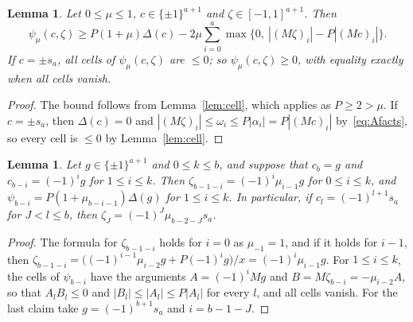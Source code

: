 \documentclass[11pt]{article}
\newtheorem{lemma}[theorem]{Lemma}
\theoremstyle{remark}
\begin{document}
\begin{lemma}\label{lem:onecol}
Let $0\le\mu\le1$, $c\in\{\pm1\}^{a+1}$ and $\zeta\in[-1,1]^{a+1}$. Then
\[
\psi_\mu(c,\zeta)\ge P(1+\mu)\Delta(c)-2\mu\sum_{i=0}^a
\max\bigl\{0,\ |(M\zeta)_i|-P|(Mc)_i|\bigr\}.
\]
If $c=\pm s_a$, all cells of $\psi_\mu(c,\zeta)$ are $\le0$; so
$\psi_\mu(c,\zeta)\ge0$, with equality exactly when all cells vanish.
\end{lemma}
\begin{proof}
The bound follows from Lemma~\ref{lem:cell}, which applies as $P\ge2>\mu$. If
$c=\pm s_a$, then $\Delta(c)=0$ and
$|(M\zeta)_i|\le\omega_i\le P|\alpha_i|=P|(Mc)_i|$ by~\eqref{eq:Afacts}, so
every cell is $\le0$ by Lemma~\ref{lem:cell}.
\end{proof}

\begin{lemma}\label{lem:chain}
Let $g\in\{\pm1\}^{a+1}$ and $0\le k\le b$, and suppose that $c_b=g$ and
$c_{b-i}=(-1)^ig$ for $1\le i\le k$. Then $\zeta_{b-1-i}=(-1)^i\mu_{i-1}g$
for $0\le i\le k$, and $\psi_{b-i}=P(1+\mu_{b-i-1})\Delta(g)$ for
$1\le i\le k$. In particular, if $c_l=(-1)^{l+1}s_a$ for $J<l\le b$, then
$\zeta_J=(-1)^J\mu_{b-2-J}s_a$.
\end{lemma}
\begin{proof}
The formula for $\zeta_{b-1-i}$ holds for $i=0$ as $\mu_{-1}=1$, and if it
holds for $i-1$, then
$\zeta_{b-1-i}=\bigl((-1)^{i-1}\mu_{i-2}g+P(-1)^ig\bigr)/x=(-1)^i\mu_{i-1}g$.
For $1\le i\le k$, the cells of $\psi_{b-i}$ have the arguments
$A=(-1)^iMg$ and $B=M\zeta_{b-i}=-\mu_{i-2}A$, so that $A_lB_l\le0$ and
$|B_l|\le|A_l|\le P|A_l|$ for every $l$, and all cells vanish. For the last
claim take $g=(-1)^{b+1}s_a$ and $i=b-1-J$.
\end{proof}
\end{document}
